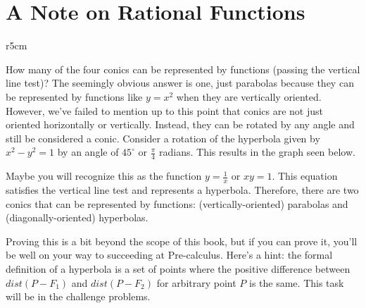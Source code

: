 \documentclass[lang=en,11pt]{elegantbook}
\begin{document}
\section{A Note on Rational Functions}
\begin{wrapfigure}{r}{5cm}
\end{wrapfigure}

\noindent How many of the four conics can be represented by functions (passing the vertical line test)?  The seemingly obvious answer is one, just parabolas because they can be represented by functions like $y=x^2$ when they are vertically oriented.  However, we've failed to mention up to this point that conics are not just oriented horizontally or vertically.  Instead, they can be rotated by any angle and still be considered a conic.  Consider a rotation of the hyperbola given by $x^2-y^2=1$ by an angle of $45^{\circ}$ or $\frac{\pi}{4}$ radians.  This results in the graph seen below.

Maybe you will recognize this as the function $y=\frac{1}{x}$ or $xy=1$.  This equation satisfies the vertical line test and represents a hyperbola.  Therefore, there are two conics that can be represented by functions: (vertically-oriented) parabolas and (diagonally-oriented) hyperbolas.

Proving this is a bit beyond the scope of this book, but if you can prove it, you'll be well on your way to succeeding at Pre-calculus.  Here's a hint: the formal definition of a hyperbola is a set of points where the positive difference between $dist(P-F_1)$ and $dist(P-F_2)$ for arbitrary point $P$ is the same. This task will be in the challenge problems.
\end{document}
